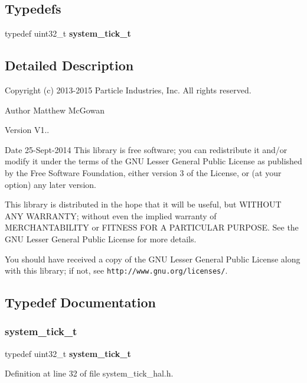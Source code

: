 \subsection*{Typedefs}
\begin{DoxyCompactItemize}
\item 
typedef uint32\+\_\+t \textbf{ system\+\_\+tick\+\_\+t}
\end{DoxyCompactItemize}


\subsection{Detailed Description}
Copyright (c) 2013-\/2015 Particle Industries, Inc. All rights reserved. 

\begin{DoxyAuthor}{Author}
Matthew Mc\+Gowan 
\end{DoxyAuthor}
\begin{DoxyVersion}{Version}
V1.. 
\end{DoxyVersion}
\begin{DoxyDate}{Date}
25-\/\+Sept-\/2014 This library is free software; you can redistribute it and/or modify it under the terms of the G\+NU Lesser General Public License as published by the Free Software Foundation, either version 3 of the License, or (at your option) any later version.
\end{DoxyDate}
This library is distributed in the hope that it will be useful, but W\+I\+T\+H\+O\+UT A\+NY W\+A\+R\+R\+A\+N\+TY; without even the implied warranty of M\+E\+R\+C\+H\+A\+N\+T\+A\+B\+I\+L\+I\+TY or F\+I\+T\+N\+E\+SS F\+OR A P\+A\+R\+T\+I\+C\+U\+L\+AR P\+U\+R\+P\+O\+SE. See the G\+NU Lesser General Public License for more details.

You should have received a copy of the G\+NU Lesser General Public License along with this library; if not, see {\tt http\+://www.\+gnu.\+org/licenses/}. 

\subsection{Typedef Documentation}
\mbox{\label{system__tick__hal_8h_a272b267acff35fc07ab6b6011843dd6c}} 
\subsubsection{system\+\_\+tick\+\_\+t}
{\footnotesize\ttfamily typedef uint32\+\_\+t \textbf{ system\+\_\+tick\+\_\+t}}



Definition at line 32 of file system\+\_\+tick\+\_\+hal.\+h.

